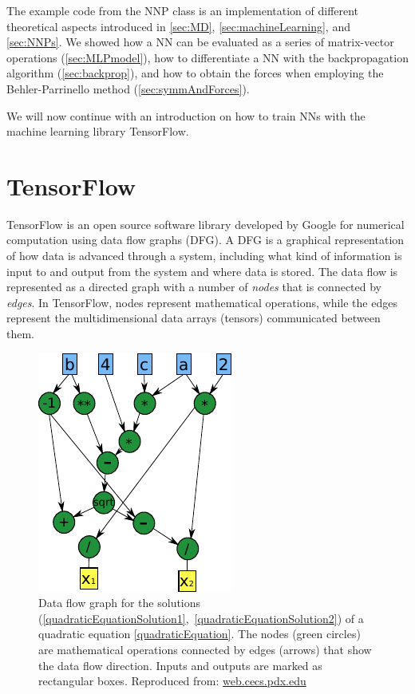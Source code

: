\documentclass[twoside,english]{uiofysmaster}
\begin{document}
The example code from the NNP class is an implementation of different theoretical aspects 
introduced in \autoref{sec:MD}, \ref{sec:machineLearning}, and \ref{sec:NNPs}. We showed how a
NN can be evaluated as a series of matrix-vector operations (\autoref{sec:MLPmodel}), 
how to differentiate a NN with the backpropagation algorithm  (\autoref{sec:backprop}), and how to 
obtain the forces when employing the Behler-Parrinello method (\autoref{sec:symmAndForces}). 

We will now continue with an introduction on how to train NNs with the machine learning library TensorFlow. 






\chapter{TensorFlow} \label{sec:tensorFlow}
TensorFlow \cite{Abadi15,Abadi16} is an open source software library 
developed by Google 
for numerical computation using data flow graphs (DFG). 
A DFG is a graphical representation of how data is
advanced through a system, including what kind of information is input
to and output from the system and where data is stored.
The data flow is represented as a directed graph
with a number of \textit{nodes} that is connected by
\textit{edges}. In TensorFlow, nodes represent
mathematical operations, while the edges represent
the multidimensional data arrays (tensors) 
communicated between them.
\begin{figure}
\centering
  \includegraphics[width=0.4\linewidth]{Figures/Implementation/DFG.pdf}
  \caption{Data flow graph for the solutions (\ref{quadraticEquationSolution1},~\ref{quadraticEquationSolution2}) of a 
	   quadratic equation \eqref{quadraticEquation}. The nodes (green circles) are mathematical 
	   operations connected by edges (arrows) that show the data flow direction. Inputs and outputs
	   are marked as rectangular boxes. Reproduced from:
  \href{http://web.cecs.pdx.edu/mperkows/temp/JULY/data-flow-graph.pdf}{web.cecs.pdx.edu}}
  \label{fig:DFG}
\end{figure}
\end{document}
